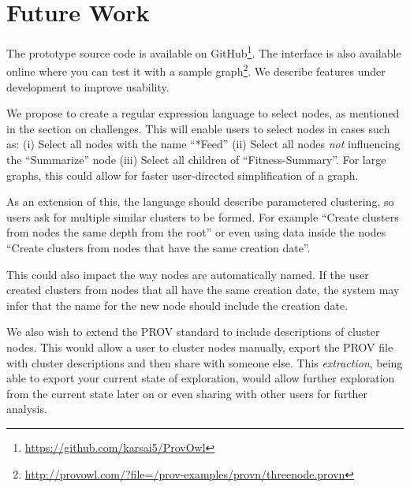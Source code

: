 \chapter{Future Work}
The prototype source code is available on GitHub\footnote{\url{https://github.com/karsai5/ProvOwl}}. The interface is also available online where you can test it with a sample graph\footnote{\url{http://provowl.com/?file=/prov-examples/provn/threenode.provn}}.
We describe features under development to improve usability.

We propose to create a regular expression language to select nodes, as mentioned in the section on challenges. 
This will enable users to select nodes in cases such as:
(i) Select all nodes with the name ``*Feed''
(ii) Select all nodes \textit{not} influencing the ``Summarize'' node
(iii) Select all children of ``Fitness-Summary''.
For large graphs, this could allow for faster user-directed simplification of a graph. 

As an extension of this, the language should describe parametered clustering, so users ask for multiple similar clusters to be formed. For example ``Create clusters from nodes the same depth from the root'' or even using data inside the nodes ``Create clusters from nodes that have the same creation date''.  

This could also impact the way nodes are automatically named. If the user created clusters from nodes that all have the same creation date, the system may infer that the name for the new node should include the creation date.

We also wish to extend the PROV standard to include descriptions of cluster nodes. This would allow a user to cluster nodes manually, export the PROV file with cluster descriptions and then share with someone else. This \textit{extraction}, being able to export your current state of exploration, would allow further exploration from the current state later on or even sharing with other users for further analysis.
